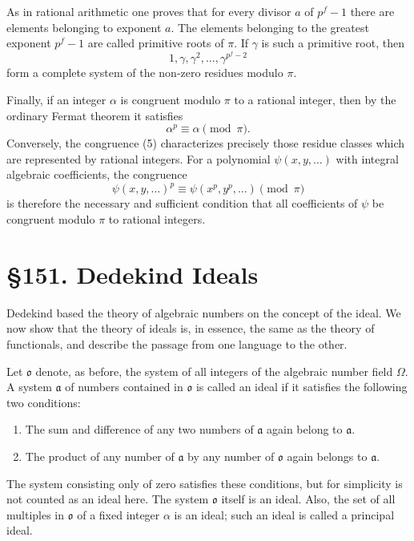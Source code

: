 \documentclass[12pt,a4paper]{article}
\newcommand{\webersection}[2]{\clearpage\section*{\S #1. #2}}
\begin{document}
As in rational arithmetic one proves that for every divisor \(a\) of \(p^f-1\) there are elements belonging to exponent \(a\).  The elements belonging to the greatest exponent \(p^f-1\) are called primitive roots of \(\pi\).  If \(\gamma\) is such a primitive root, then
\[
 1,\gamma,
\gamma^2,
\ldots,
\gamma^{p^f-2}
\]
form a complete system of the non-zero residues modulo \(\pi\).

Finally, if an integer \(\alpha\) is congruent modulo \(\pi\) to a rational integer, then by the ordinary Fermat theorem it satisfies
\begin{equation}
 \alpha^p\equiv \alpha\pmod{\pi}. \tag{5}
\end{equation}
Conversely, the congruence (5) characterizes precisely those residue classes which are represented by rational integers.  For a polynomial \(\psi(x,y,
\ldots)\) with integral algebraic coefficients, the congruence
\begin{equation}
 \psi(x,y,
\ldots)^p\equiv \psi(x^p,y^p,
\ldots)\pmod{\pi} \tag{6}
\end{equation}
is therefore the necessary and sufficient condition that all coefficients of \(\psi\) be congruent modulo \(\pi\) to rational integers.

\webersection{151}{Dedekind Ideals}

Dedekind based the theory of algebraic numbers on the concept of the ideal.  We now show that the theory of ideals is, in essence, the same as the theory of functionals, and describe the passage from one language to the other.

Let \(\mathfrak o\) denote, as before, the system of all integers of the algebraic number field \(\Omega\).  A system \(\mathfrak a\) of numbers contained in \(\mathfrak o\) is called an ideal if it satisfies the following two conditions:
\begin{enumerate}[label=\Roman*.]
\item The sum and difference of any two numbers of \(\mathfrak a\) again belong to \(\mathfrak a\).
\item The product of any number of \(\mathfrak a\) by any number of \(\mathfrak o\) again belongs to \(\mathfrak a\).
\end{enumerate}
The system consisting only of zero satisfies these conditions, but for simplicity is not counted as an ideal here.  The system \(\mathfrak o\) itself is an ideal.  Also, the set of all multiples in \(\mathfrak o\) of a fixed integer \(\alpha\) is an ideal; such an ideal is called a principal ideal.
\end{document}
